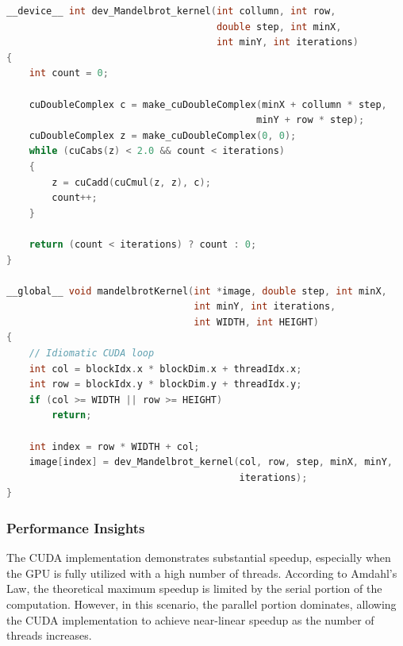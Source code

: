 \documentclass[
	report, %
	11pt, %
]{CSUniSchoolLabReport}
\newcounter{ct}
\begin{document}
\begin{lstlisting}[language=C++, caption={CUDA Kernel Functions for Mandelbrot Set Computation}, label={lst:mandelbrot_cuda}]
__device__ int dev_Mandelbrot_kernel(int collumn, int row,
                                     double step, int minX,
                                     int minY, int iterations)
{
    int count = 0;

    cuDoubleComplex c = make_cuDoubleComplex(minX + collumn * step,
                                            minY + row * step);
    cuDoubleComplex z = make_cuDoubleComplex(0, 0);
    while (cuCabs(z) < 2.0 && count < iterations)
    {
        z = cuCadd(cuCmul(z, z), c);
        count++;
    }

    return (count < iterations) ? count : 0;
}

__global__ void mandelbrotKernel(int *image, double step, int minX,
                                 int minY, int iterations,
                                 int WIDTH, int HEIGHT)
{
    // Idiomatic CUDA loop
    int col = blockIdx.x * blockDim.x + threadIdx.x;
    int row = blockIdx.y * blockDim.y + threadIdx.y;
    if (col >= WIDTH || row >= HEIGHT)
        return;

    int index = row * WIDTH + col;
    image[index] = dev_Mandelbrot_kernel(col, row, step, minX, minY,
                                         iterations);
}
\end{lstlisting}

\subsubsection{Performance Insights}

The CUDA implementation demonstrates substantial speedup, especially when the GPU is fully utilized with a high number of threads. According to Amdahl's Law, the theoretical maximum speedup is limited by the serial portion of the computation. However, in this scenario, the parallel portion dominates, allowing the CUDA implementation to achieve near-linear speedup as the number of threads increases.
\end{document}
